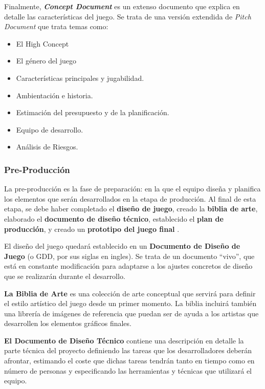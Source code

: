 Finalmente, \textbf{\textit{Concept Document}} es un extenso documento que explica en detalle las características del juego. Se trata de una versión extendida de \textit{Pitch Document} que trata temas como: 
\begin{itemize}
\item El High Concept
\item El género del juego
\item Características principales y jugabilidad.
\item Ambientación e historia.
\item Estimación del presupuesto y de la planificación.
\item Equipo de desarrollo.
\item Análisis de Riesgos.
\end{itemize}

\subsubsection{Pre-Producción}
La pre-producción es la fase de preparación: en la que el equipo diseña y planifica los elementos que serán desarrollados en la etapa de producción. Al final de esta etapa, se debe haber completado el \textbf{diseño de juego}, creado la \textbf{biblia de arte}, elaborado el \textbf{documento de diseño técnico}, establecido el \textbf{plan de producción}, y creado un \textbf{prototipo del juego final} \cite{game_design_2}.

El diseño del juego quedará establecido en un \textbf{Documento de Diseño de Juego} (o GDD, por sus siglas en ingles). Se trata de un documento ``vivo'', que está en constante modificación para adaptarse a los ajustes concretos de diseño que se realizarán durante el desarrollo.

\textbf{La Biblia de Arte} es una colección de arte conceptual que servirá para definir el estilo artístico del juego desde un primer momento. La biblia incluirá también una librería de imágenes de referencia que puedan ser de ayuda a los artistas que desarrollen los elementos gráficos finales.

\textbf{El Documento de Diseño Técnico} contiene una descripción en detalle la parte técnica del proyecto definiendo las tareas que los desarrolladores deberán afrontar, estimando el coste que dichas tareas tendrán tanto en tiempo como en número de personas y especificando las herramientas y técnicas que utilizará el equipo.

